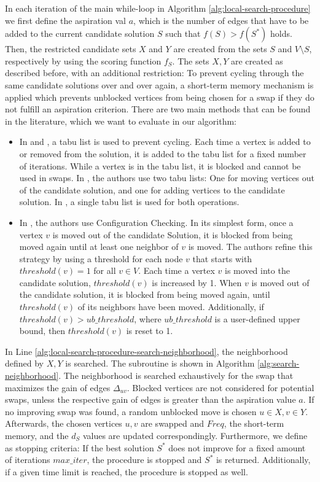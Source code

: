 \documentclass[draft,final]{vutinfth} %
\begin{document}
In each iteration of the main while-loop in Algorithm \ref{alg:local-search-procedure} we first define the aspiration val $a$, which is the number of edges that have to be added to the current candidate solution $S$ such that $f(S) > f(S^*)$ holds. 
Then, the restricted candidate sets $X$ and $Y$ are created from the sets $S$ and $V \setminus S$, respectively by using the scoring function $f_S$. 
The sets $X, Y$ are created as described before, with an additional restriction: To prevent cycling through the same candidate solutions over and over again, a short-term memory mechanism is applied which prevents unblocked vertices from being chosen for a swap if they do not fulfill an aspiration criterion. 
There are two main methods that can be found in the literature, which we want to evaluate in our algorithm: 
\begin{itemize}
    \item In \cite{djeddi_extension_2019} and \cite{zhou_opposition-based_2020}, a tabu list is used to prevent cycling. Each time a vertex is added to or removed from the solution, it is added to the tabu list for a fixed number of iterations. While a vertex is in the tabu list, it is blocked and cannot be used in swaps. In \cite{djeddi_extension_2019}, the authors use two tabu lists: One for moving vertices out of the candidate solution, and one for adding vertices to the candidate solution. In \cite{zhou_opposition-based_2020}, a single tabu list is used for both operations. 
    \item In \cite{chen_nuqclq_2021}, the authors use Configuration Checking. In its simplest form, once a vertex $v$ is moved out of the candidate Solution, it is blocked from being moved again until at least one neighbor of $v$ is moved. The authors refine this strategy by using a threshold for each node $v$ that starts with $\mathit{threshold}(v) = 1$ for all $v \in V$. Each time a vertex $v$ is moved into the candidate solution, $\mathit{threshold}(v)$ is increased by 1. When $v$ is moved out of the candidate solution, it is blocked from being moved again, until $\mathit{threshold}(v)$ of its neighbors have been moved. Additionally, if $\mathit{threshold}(v) > \mathit{ub\_threshold}$, where $\mathit{ub\_threshold}$ is a user-defined upper bound, then $\mathit{threshold}(v)$ is reset to 1. 
\end{itemize}
In Line \ref{alg:local-search-procedure-search-neighborhood}, the neighborhood defined by $X, Y$ is searched. The subroutine is shown in Algorithm \ref{alg:search-neighborhood}. The neighborhood is searched exhaustively for the swap that maximizes the gain of edges $\Delta_{uv}$. Blocked vertices are not considered for potential swaps, unless the respective gain of edges is greater than the aspiration value $a$. 
If no improving swap was found, a random unblocked move is chosen $u \in X, v \in Y$. 
Afterwards, the chosen vertices $u ,v$ are swapped and $\mathit{Freq}$, the short-term memory, and the $d_S$ values are updated correspondingly. 
Furthermore, we define as stopping criteria: If the best solution $S^*$ does not improve for a fixed amount of iterations $\mathit{max\_iter}$, the procedure is stopped and $S^*$ is returned. Additionally, if a given time limit is reached, the procedure is stopped as well. 
\end{document}

